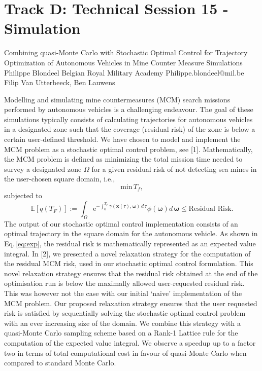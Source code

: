 \section{Track D: Technical Session 15 - Simulation}\newpage

\begin{talk}
  {Combining quasi-Monte Carlo with Stochastic Optimal Control for Trajectory Optimization of Autonomous Vehicles in Mine Counter Measure Simulations}%
  {Philippe Blondeel}%
  {Belgian Royal Military Academy}%
  {Philippe.blondeel@mil.be}%
  {Filip Van Utterbeeck, Ben Lauwens}%
  
    
   
Modelling and simulating mine countermeasures (MCM) search missions performed by autonomous vehicles is a challenging endeavour. The goal of these simulations typically consists of calculating trajectories for autonomous vehicles in a designated zone such that the coverage (residual risk) of the zone is below a certain user-defined threshold. We have chosen to model and implement the MCM problem as a stochastic optimal control problem, see [1]. Mathematically, the MCM problem is defined as minimizing the total mission time needed to survey a designated zone $\Omega$ for a given residual risk of not detecting sea mines in the  user-chosen square  domain, i.e., 
\begin{equation}
\text{min}\, T_f,
\label{eq:min}
\end{equation}
subjected to
\begin{equation}
 \mathbb{E}[q\left(T_F\right)] :=  \int_\Omega \text{e}^{-\int_0^{T_F} \gamma\left(\bm{x}\left(\tau\right),\bm{\omega}\right)\, d\,\tau}\phi\left(\bm{\omega}\right) d\,\bm{\omega} \leq \text{Residual Risk}.
\label{eq:exp}
\end{equation}
The output of our stochastic optimal control implementation consists of an optimal trajectory in the square domain for the autonomous vehicle.  As shown in Eq.\,\eqref{eq:exp}, the residual risk is mathematically represented as an expected value integral. In [2], we presented a novel relaxation strategy for the computation of the residual MCM risk, used in our stochastic optimal control formulation. This novel relaxation strategy ensures that the  residual risk obtained at the end of the optimisation run is below the maximally allowed user-requested residual risk. This was however not the case  with our initial `naive' implementation of the MCM problem. Our proposed relaxation strategy ensures that the user requested risk is satisfied by sequentially solving the stochastic optimal control problem with an ever increasing size of the domain. We combine this strategy with  a quasi-Monte Carlo  sampling scheme based on a Rank-1 Lattice rule for the computation of the expected value integral. We observe a speedup up to a factor two in terms of total computational cost in favour of quasi-Monte Carlo when compared to standard Monte Carlo.



\end{talk}
